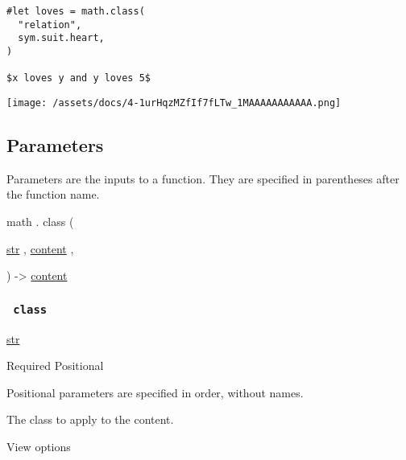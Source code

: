 \begin{verbatim}
#let loves = math.class(
  "relation",
  sym.suit.heart,
)

$x loves y and y loves 5$
\end{verbatim}

\texttt{[image: /assets/docs/4-1urHqzMZfIf7fLTw\_1MAAAAAAAAAAA.png]}

\subsection{\texorpdfstring{{ Parameters
}}{ Parameters }}\label{parameters}

\label{parameters-tooltip}
Parameters are the inputs to a function. They are specified in
parentheses after the function name.

math { . } { class } (

{ \href{/docs/reference/foundations/str/}{str} , } {
\href{/docs/reference/foundations/content/}{content} , }

) -\textgreater{} \href{/docs/reference/foundations/content/}{content}

\subsubsection{\texorpdfstring{\texttt{\ class\ }}{ class }}\label{parameters-class}

\href{/docs/reference/foundations/str/}{str}

{Required} {{ Positional }}

\label{parameters-class-positional-tooltip}
Positional parameters are specified in order, without names.

The class to apply to the content.


View options

